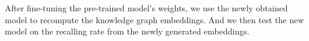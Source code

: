 After fine-tuning the pre-trained model's weights, we use the newly obtained model to recompute the knowledge graph embeddings. And we then test the new model on the recalling rate from the newly generated embeddings.

